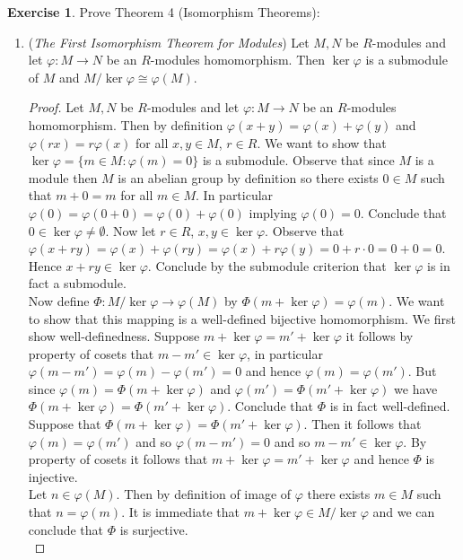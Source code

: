 \documentclass[8pt]{amsart}
\theoremstyle{plain}%
\theoremstyle{definition}
\newtheorem{exercise}{Exercise}[section]
\theoremstyle{remark}
\numberwithin{equation}{section}
\begin{document}
\begin{exercise}
Prove Theorem 4 (Isomorphism Theorems):
	\begin{enumerate}
		\item (\textit{The First Isomorphism Theorem for Modules}) Let $M, N$ be $R$-modules and let $\varphi : M \to N$ be an $R$-modules homomorphism. Then $\ker \varphi$ is a submodule of $M$ and $M/\ker \varphi \cong \varphi(M)$.
			\begin{proof}
				Let $M, N$ be $R$-modules and let $\varphi : M \to N$ be an $R$-modules homomorphism. Then by definition $\varphi(x + y) = \varphi(x) + \varphi(y)$ and $\varphi(rx) = r\varphi(x)$ for all $x, y \in M$, $r \in R$. We want to show that $\ker \varphi = \{m \in M : \varphi(m) = 0\}$ is a submodule. Observe that since $M$ is a module then $M$ is an abelian group by definition so there exists $0 \in M$ such that $m + 0 = m$ for all $m \in M$. In particular $\varphi(0) = \varphi(0 + 0) = \varphi(0) + \varphi(0)$ implying $\varphi(0) = 0$. Conclude that $0 \in \ker \varphi \neq \emptyset$. Now let $r \in R$, $x, y \in \ker \varphi$. Observe that $\varphi(x + ry) = \varphi(x) + \varphi(ry) = \varphi(x) + r\varphi(y) = 0 + r \cdot 0 = 0 + 0 = 0$. Hence $x + ry \in \ker \varphi$. Conclude by the submodule criterion that $\ker \varphi$ is in fact a submodule.\\

				Now define $\Phi : M/\ker \varphi \to \varphi(M)$ by $\Phi(m + \ker \varphi) = \varphi(m)$. We want to show that this mapping is a well-defined bijective homomorphism. We first show well-definedness. Suppose $m + \ker \varphi = m' + \ker \varphi$ it follows by property of cosets that $m - m' \in \ker \varphi$, in particular $\varphi(m - m') = \varphi(m) - \varphi(m') = 0$ and hence $\varphi(m) = \varphi(m')$. But since $\varphi(m) = \Phi(m + \ker \varphi)$ and $\varphi(m') = \Phi(m' + \ker\varphi)$ we have $\Phi(m + \ker\varphi) = \Phi(m' + \ker\varphi)$. Conclude that $\Phi$ is in fact well-defined.\\

				Suppose that $\Phi(m + \ker\varphi) = \Phi(m' + \ker\varphi)$. Then it follows that $\varphi(m) = \varphi(m')$ and so $\varphi(m - m') = 0$ and so $m - m' \in \ker\varphi$. By property of cosets it follows that $m + \ker\varphi = m' + \ker\varphi$ and hence $\Phi$ is injective.\\

				Let $n \in \varphi(M)$. Then by definition of image of $\varphi$ there exists $m \in M$ such that $n = \varphi(m)$. It is immediate that $m + \ker\varphi \in M/\ker\varphi$ and we can conclude that $\Phi$ is surjective.\\


\end{proof}
\end{enumerate}
\end{exercise}
\end{document}
